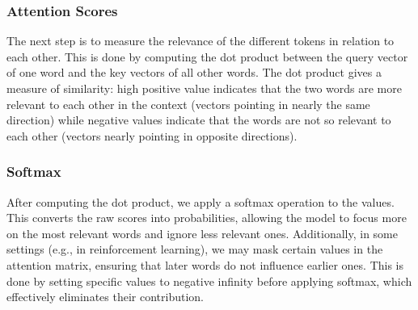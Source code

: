 \subsubsection{Attention Scores}
The next step is to measure the relevance of the different tokens in relation to each other. This is done by 
computing the dot product between the query vector of one word and the key vectors of all other words. The 
dot product gives a measure of similarity: high positive value indicates that the two words are more relevant to 
each other in the context (vectors pointing in nearly the same direction) while negative values indicate that the words
are not so relevant to each other (vectors nearly pointing in opposite directions).

\subsubsection{Softmax}
After computing the dot product, we apply a softmax operation to the values. This converts the raw scores 
into probabilities, allowing the model to focus more on the most relevant words and ignore less relevant 
ones.\newline
Additionally, in some settings (e.g., in reinforcement learning), we may mask certain values in the 
attention matrix, ensuring that later words do not influence earlier ones. This is done by setting specific
values to negative infinity before applying softmax, which effectively eliminates their contribution.


